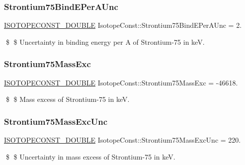 \subsubsection{\texorpdfstring{Strontium75\+Bind\+E\+Per\+A\+Unc}{Strontium75BindEPerAUnc}}
{\footnotesize\ttfamily \mbox{\hyperlink{group___isotope_const-_macros_ga8f45a7272ce02c0b4c65c44636ed719a}{I\+S\+O\+T\+O\+P\+E\+C\+O\+N\+S\+T\+\_\+\+D\+O\+U\+B\+LE}} Isotope\+Const\+::\+Strontium75\+Bind\+E\+Per\+A\+Unc = 2.}

\$ \$ Uncertainty in binding energy per A of Strontium-\/75 in keV. \mbox{\label{group___isotope_const-_strontium-_sr75_gafa71f90e7b686514819addcc32aae7ce}} 
\subsubsection{\texorpdfstring{Strontium75\+Mass\+Exc}{Strontium75MassExc}}
{\footnotesize\ttfamily \mbox{\hyperlink{group___isotope_const-_macros_ga8f45a7272ce02c0b4c65c44636ed719a}{I\+S\+O\+T\+O\+P\+E\+C\+O\+N\+S\+T\+\_\+\+D\+O\+U\+B\+LE}} Isotope\+Const\+::\+Strontium75\+Mass\+Exc = -\/46618.}

\$ \$ Mass excess of Strontium-\/75 in keV. \mbox{\label{group___isotope_const-_strontium-_sr75_gadcd570f7744708b53026f45710acbe8b}} 
\subsubsection{\texorpdfstring{Strontium75\+Mass\+Exc\+Unc}{Strontium75MassExcUnc}}
{\footnotesize\ttfamily \mbox{\hyperlink{group___isotope_const-_macros_ga8f45a7272ce02c0b4c65c44636ed719a}{I\+S\+O\+T\+O\+P\+E\+C\+O\+N\+S\+T\+\_\+\+D\+O\+U\+B\+LE}} Isotope\+Const\+::\+Strontium75\+Mass\+Exc\+Unc = 220.}

\$ \$ Uncertainty in mass excess of Strontium-\/75 in keV. \mbox{\label{group___isotope_const-_strontium-_sr75_ga2df790d04f6f2b98b351d0f37530428f}} 
